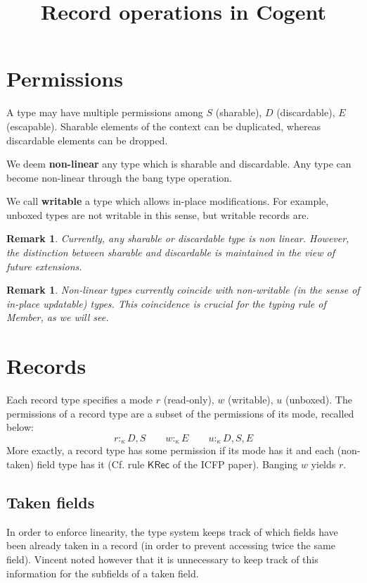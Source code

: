 \documentclass{article}
\title{Record operations in Cogent}
\newtheorem{remark}[theorem]{Remark}
\begin{document}
\maketitle

\section{Permissions}
A type may have multiple permissions among $S$ (sharable), $D$ (discardable), $E$ (escapable).
Sharable elements of the context can be duplicated, whereas discardable
elements can be dropped.

We deem \textbf{non-linear} any type which is sharable and discardable.
Any type can become non-linear through the bang type operation. 

We call \textbf{writable} a type which allows in-place modifications. For
example, unboxed types are not writable in this sense, but writable records are.

\begin{remark}
\label{r:S-D-non-lin}  
  Currently, any sharable or discardable type is non linear.
  However, the distinction between sharable and discardable is maintained in the view of future extensions.
\end{remark}
\begin{remark}
 \label{r:S-D-non-writable} Non-linear types currently coincide with non-writable (in the
 sense of in-place updatable) types. This coincidence is crucial for the typing rule of
 Member, as we will see.
\end{remark}


\section{Records}
Each record type specifies a mode $r$ (read-only), $w$ (writable), $u$ (unboxed).
The permissions of a record type are a subset of the permissions of its mode,
recalled below:
\[
  r:_\kappa {D,S}\qquad
  w:_\kappa {E}\qquad
  u:_\kappa {D,S,E}
\]
More exactly, a record type has some permission if its mode has it and each
(non-taken) field type has it (Cf. rule $\mathsf{KRec}$ of the ICFP paper).
Banging $w$ yields $r$.

\subsection{Taken fields}
In order to enforce linearity, the type system keeps track of which fields
have been already taken in a record (in order to prevent accessing twice the
same field). Vincent noted however that it is unnecessary to keep track of this
information for the subfields of a taken field.
\end{document}
